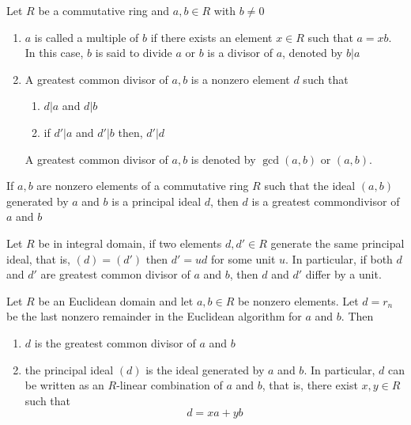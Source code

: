 \begin{definition}
	Let $R$ be a commutative ring and $a, b \in R$ with $b \neq 0$
	\begin{enumerate}
		\item $a$ is called a multiple of $b$ if there exists an element $x \in R$ such that $a = xb$. In this case, $b$ is said to divide $a$ or $b$ is a divisor of $a$, denoted by $b | a$
		
		\item A greatest common divisor of $a, b$ is a nonzero element $d$ such that
		\begin{enumerate}
			\item $d | a$ and $d | b$
			\item if $d' | a$ and $d' | b$ then, $d' | d$
		\end{enumerate}
		
		A greatest common divisor of $a, b$ is denoted by $\gcd(a, b)$ or $(a, b)$.
		
	\end{enumerate}
\end{definition}

\begin{proposition}
	If $a, b$ are nonzero elements of a commutative ring $R$ such that the ideal $(a, b)$ generated by $a$ and $b$ is a principal ideal $d$, then $d$ is a greatest commondivisor of $a$ and $b$
	
\end{proposition}

\begin{proposition}
	Let $R$ be in integral domain, if two elements $d, d' \in R$ generate the same principal ideal, that is, $(d) = (d')$ then $d' = ud$ for some unit $u$. In particular, if both $d$ and $d'$ are greatest common divisor of $a$ and $b$, then $d$ and $d'$ differ by a unit.
	
\end{proposition}

\begin{theorem}
	Let $R$ be an Euclidean domain and let $a, b \in R$ be nonzero elements. Let $d = r_n$ be the last nonzero remainder in the Euclidean algorithm for $a$ and $b$. Then
	\begin{enumerate}
		\item $d$ is the greatest common divisor of $a$ and $b$
		\item the principal ideal $(d)$ is the ideal generated by $a$ and $b$. In particular, $d$ can be written as an $R$-linear combination of $a$ and $b$, that is, there exist $x, y \in R$ such that
		$$
			d = xa + yb
		$$
	\end{enumerate}
\end{theorem}

